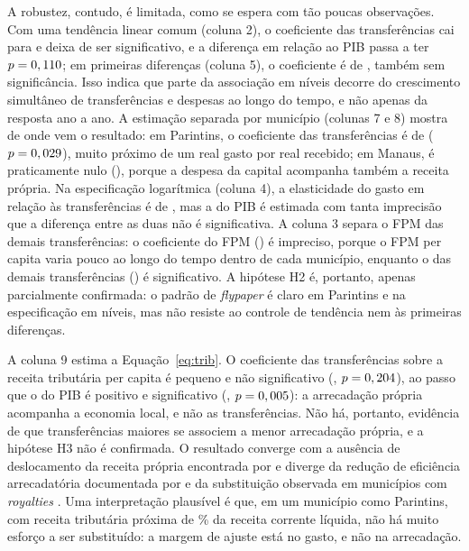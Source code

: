 A robustez, contudo, é limitada, como se espera com tão poucas observações. Com uma tendência linear comum (coluna 2), o coeficiente das transferências cai para \bTrDois{} e deixa de ser significativo, e a diferença em relação ao PIB passa a ter $p=0,110$; em primeiras diferenças (coluna 5), o coeficiente é de \bTrCinco{}, também sem significância. Isso indica que parte da associação em níveis decorre do crescimento simultâneo de transferências e despesas ao longo do tempo, e não apenas da resposta ano a ano. A estimação separada por município (colunas 7 e 8) mostra de onde vem o resultado: em Parintins, o coeficiente das transferências é de \bTrDez{} ($p=0,029$), muito próximo de um real gasto por real recebido; em Manaus, é praticamente nulo (\bTrNove), porque a despesa da capital acompanha também a receita própria. Na especificação logarítmica (coluna 4), a elasticidade do gasto em relação às transferências é de \bTrQuatro{}, mas a do PIB é estimada com tanta imprecisão que a diferença entre as duas não é significativa. A coluna 3 separa o FPM das demais transferências: o coeficiente do FPM (\bFpmTres) é impreciso, porque o FPM per capita varia pouco ao longo do tempo dentro de cada município, enquanto o das demais transferências (\bOutTres) é significativo. A hipótese H2 é, portanto, apenas parcialmente confirmada: o padrão de \textit{flypaper} é claro em Parintins e na especificação em níveis, mas não resiste ao controle de tendência nem às primeiras diferenças.

A coluna 9 estima a Equação~\eqref{eq:trib}. O coeficiente das transferências sobre a receita tributária per capita é pequeno e não significativo (\bTrSete, $p=0,204$), ao passo que o do PIB é positivo e significativo (\bPibSete, $p=0,005$): a arrecadação própria acompanha a economia local, e não as transferências. Não há, portanto, evidência de que transferências maiores se associem a menor arrecadação própria, e a hipótese H3 não é confirmada. O resultado converge com a ausência de deslocamento da receita própria encontrada por  e diverge da redução de eficiência arrecadatória documentada por  e da substituição observada em municípios com \textit{royalties} \cite{postali2015}. Uma interpretação plausível é que, em um município como Parintins, com receita tributária próxima de \autParMedia\% da receita corrente líquida, não há muito esforço a ser substituído: a margem de ajuste está no gasto, e não na arrecadação.

